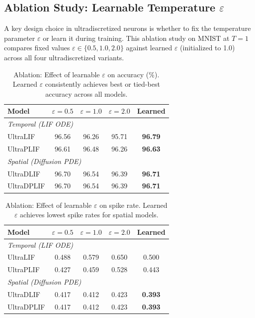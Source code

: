 \documentclass{article}
\theoremstyle{plain}
\theoremstyle{definition}
\theoremstyle{remark}
\newcommand{\eps}{\varepsilon}
\begin{document}
\subsection{Ablation Study: Learnable Temperature $\eps$}
\label{app:eps_ablation}

A key design choice in ultradiscretized neurons is whether to fix the temperature parameter $\eps$ or learn it during training. This ablation study on MNIST at $T{=}1$ compares fixed values $\eps \in \{0.5, 1.0, 2.0\}$ against learned $\eps$ (initialized to 1.0) across all four ultradiscretized variants.

\begin{table}[h]
\caption{Ablation: Effect of learnable $\eps$ on accuracy (\%). Learned $\eps$ consistently achieves best or tied-best accuracy across all models.}
\label{tab:eps_ablation_acc}
\vskip 0.1in
\begin{center}
\begin{small}
\begin{tabular}{lcccc}
\toprule
Model & $\eps{=}0.5$ & $\eps{=}1.0$ & $\eps{=}2.0$ & Learned \\
\midrule
\multicolumn{5}{l}{\textit{Temporal (LIF ODE)}} \\
UltraLIF   & 96.56 & 96.26 & 95.71 & \textbf{96.79} \\
UltraPLIF  & 96.61 & 96.48 & 96.26 & \textbf{96.63} \\
\midrule
\multicolumn{5}{l}{\textit{Spatial (Diffusion PDE)}} \\
UltraDLIF  & 96.70 & 96.54 & 96.39 & \textbf{96.71} \\
UltraDPLIF & 96.70 & 96.54 & 96.39 & \textbf{96.71} \\
\bottomrule
\end{tabular}
\end{small}
\end{center}
\vskip -0.1in
\end{table}

\begin{table}[h]
\caption{Ablation: Effect of learnable $\eps$ on spike rate. Learned $\eps$ achieves lowest spike rates for spatial models.}
\label{tab:eps_ablation_spike}
\vskip 0.1in
\begin{center}
\begin{small}
\begin{tabular}{lcccc}
\toprule
Model & $\eps{=}0.5$ & $\eps{=}1.0$ & $\eps{=}2.0$ & Learned \\
\midrule
\multicolumn{5}{l}{\textit{Temporal (LIF ODE)}} \\
UltraLIF   & 0.488 & 0.579 & 0.650 & 0.500 \\
UltraPLIF  & 0.427 & 0.459 & 0.528 & 0.443 \\
\midrule
\multicolumn{5}{l}{\textit{Spatial (Diffusion PDE)}} \\
UltraDLIF  & 0.417 & 0.412 & 0.423 & \textbf{0.393} \\
UltraDPLIF & 0.417 & 0.412 & 0.423 & \textbf{0.393} \\
\bottomrule
\end{tabular}
\end{small}
\end{center}
\vskip -0.1in
\end{table}
\end{document}
